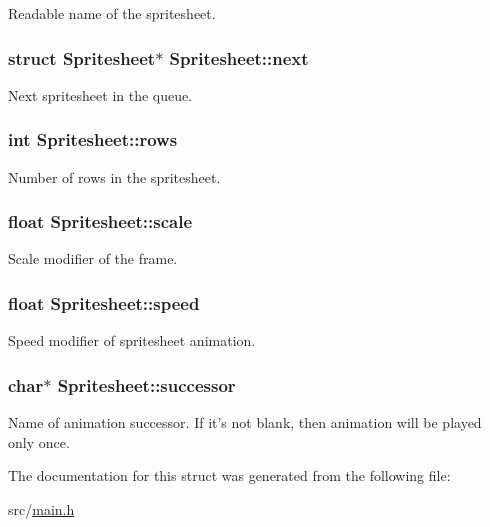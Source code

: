 Readable name of the spritesheet. \hypertarget{structSpritesheet_a671f77f759138aa2c852e5252b6daac5}{
\subsubsection[{next}]{\setlength{\rightskip}{0pt plus 5cm}struct {\bf Spritesheet}$\ast$ Spritesheet\-::next}}\label{structSpritesheet_a671f77f759138aa2c852e5252b6daac5}
Next spritesheet in the queue. \hypertarget{structSpritesheet_aeab321ce6cdd45cc8a5078e80480510e}{
\subsubsection[{rows}]{\setlength{\rightskip}{0pt plus 5cm}int Spritesheet\-::rows}}\label{structSpritesheet_aeab321ce6cdd45cc8a5078e80480510e}
Number of rows in the spritesheet. \hypertarget{structSpritesheet_ac46cf3d01609f66aae140e3b7d3d1109}{
\subsubsection[{scale}]{\setlength{\rightskip}{0pt plus 5cm}float Spritesheet\-::scale}}\label{structSpritesheet_ac46cf3d01609f66aae140e3b7d3d1109}
Scale modifier of the frame. \hypertarget{structSpritesheet_ad011770ca540de2bad85f0cb155c774b}{
\subsubsection[{speed}]{\setlength{\rightskip}{0pt plus 5cm}float Spritesheet\-::speed}}\label{structSpritesheet_ad011770ca540de2bad85f0cb155c774b}
Speed modifier of spritesheet animation. \hypertarget{structSpritesheet_a8132723c6e2d6b939b11852062eefe67}{
\subsubsection[{successor}]{\setlength{\rightskip}{0pt plus 5cm}char$\ast$ Spritesheet\-::successor}}\label{structSpritesheet_a8132723c6e2d6b939b11852062eefe67}
Name of animation successor. If it's not blank, then animation will be played only once. 

The documentation for this struct was generated from the following file\-:\begin{DoxyCompactItemize}
\item 
src/\hyperlink{main_8h}{main.\-h}\end{DoxyCompactItemize}
